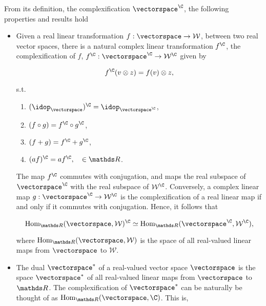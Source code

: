 \documentclass{homework}
\begin{document}
\begin{remark}
    \textnormal{From its definition, the complexification $\vectorspace^\C$, the following properties and results hold}
    
    \begin{itemize}
        \item \textnormal{Given a real linear transformation $f: \vectorspace \rightarrow \mathcal{W}$, between two real vector spaces, there is a natural complex linear transformation $f^\C$, the complexification of $f$, $f^\C : \vectorspace^\C \rightarrow \mathcal{W}^\C$ given by}
        
        \begin{equation*}
            f^\C (v\otimes z) = f(v) \otimes z, 
        \end{equation*}
        
        \textnormal{ s.t. } 
        
        \begin{enumerate}
             \item $(\idop_\vectorspace)^\C = \idop_{\vectorspace^\C}$,
             \item $(f \circ g) = f^\C \circ g^\C$,
             \item $(f + g) = f^\C + g^\C$,
             \item $(af)^\C = a f^\C, \quad \in \R$.
        \end{enumerate} 
        
        \textnormal{
        The map $f^\C$ commutes with conjugation, and maps the real subspace of $\vectorspace^\C$ with the real subspace of $\mathcal{W}^\C$. Conversely, a complex linear map $g : \vectorspace^\C \rightarrow \mathcal{W}^\C$ is the complexification of a real linear map if and only if it commutes with conjugation. Hence, it follows that 
        }
        
        $$
            \textnormal{Hom}_{\R}(\vectorspace, \mathcal{W})^\C \simeq \textnormal{Hom}_{\R}(\vectorspace^\C, \mathcal{W}^\C),
        $$
        
        \textnormal{
        where $\textnormal{Hom}_{\R}(\vectorspace, \mathcal{W})$ is the space of all real-valued linear maps from $\vectorspace$ to $\mathcal{W}$.
        }
        
        \item \textnormal{
        The dual $\vectorspace^{*}$ of a real-valued vector space $\vectorspace$ is the space $\vectorspace^{*}$ of all real-valued linear maps from $\vectorspace$ to $\R$. 
        The complexification of $\vectorspace^{*}$ can be naturally be thought of as $\textnormal{Hom}_{\R}(\vectorspace, \C)$. This is,
        }
        

\end{itemize}
\end{remark}
\end{document}
